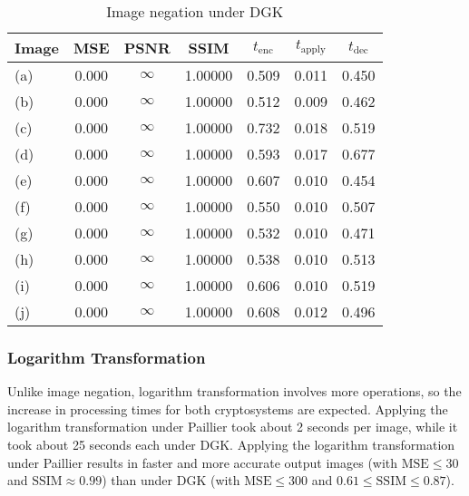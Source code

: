 \begin{table}[h]
	\centering
	\caption{Image negation under DGK}
	\label{tbl:neg-dgk}
    \begin{tabular}{lcccccc}
        \toprule
        Image & MSE  & PSNR & SSIM & $t_\text{enc}$ & $t_\text{apply}$ & $t_\text{dec}$ \\ \midrule
		(a) & 0.000 & $\infty$ & 1.00000 & 0.509 & 0.011 & 0.450 \\
		(b) & 0.000 & $\infty$ & 1.00000 & 0.512 & 0.009 & 0.462 \\
		(c) & 0.000 & $\infty$ & 1.00000 & 0.732 & 0.018 & 0.519 \\
		(d) & 0.000 & $\infty$ & 1.00000 & 0.593 & 0.017 & 0.677 \\
		(e) & 0.000 & $\infty$ & 1.00000 & 0.607 & 0.010 & 0.454 \\
		(f) & 0.000 & $\infty$ & 1.00000 & 0.550 & 0.010 & 0.507 \\
		(g) & 0.000 & $\infty$ & 1.00000 & 0.532 & 0.010 & 0.471 \\
		(h) & 0.000 & $\infty$ & 1.00000 & 0.538 & 0.010 & 0.513 \\
		(i) & 0.000 & $\infty$ & 1.00000 & 0.606 & 0.010 & 0.519 \\
		(j) & 0.000 & $\infty$ & 1.00000 & 0.608 & 0.012 & 0.496 \\
		\bottomrule
        \end{tabular}
\end{table}

\subsubsection{Logarithm Transformation}
Unlike image negation, logarithm transformation involves more operations, so the increase in processing times for both cryptosystems are expected. Applying the logarithm transformation under Paillier took about 2 seconds per image, while it took about 25 seconds each under DGK. Applying the logarithm transformation under Paillier results in faster and more accurate output images (with $\text{MSE} \le 30$ and $\text{SSIM} \approx 0.99$) than under DGK (with $\text{MSE} \le 300$ and $0.61 \le \text{SSIM} \le 0.87$).

